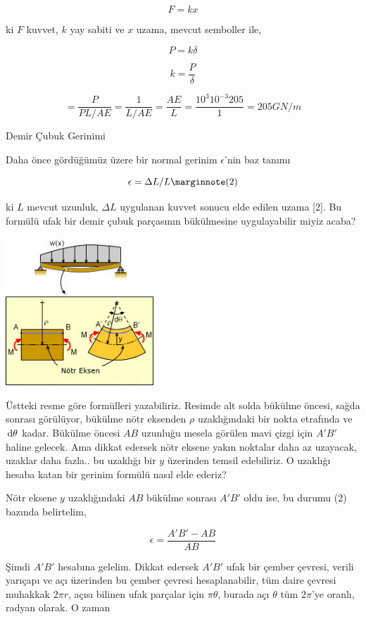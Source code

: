 \documentclass[12pt,fleqn]{article}\usepackage{../../common}
\begin{document}
$$
F = k x
$$

ki $F$ kuvvet, $k$ yay sabiti ve $x$ uzama, mevcut semboller ile,

$$
P = k \delta
$$

$$
k = \frac{P}{\delta}
$$

$$
= \frac{P}{PL / AE} = \frac{1}{L / AE} = \frac{AE}{L} =
\frac{10^3 10^{-3} 205}{1} =
205 GN/m
$$

Demir Çubuk Gerinimi

Daha önce gördüğümüz üzere bir normal gerinim $\epsilon$'nin baz tanımı

$$
\epsilon = \Delta L / L
\mlabel{2}
$$

ki $L$ mevcut uzunluk, $\Delta L$ uygulanan kuvvet sonucu elde edilen uzama [2].
Bu formülü ufak bir demir çubuk parçasının bükülmesine uygulayabilir miyiz
acaba? 

\includegraphics[width=15em]{phy_020_strs_00_03.jpg}

Üstteki resme göre formülleri yazabiliriz. Resimde alt solda bükülme öncesi,
sağda sonrası görülüyor, bükülme nötr eksenden $\rho$ uzaklığındaki bir nokta
etrafında ve $\,\mathrm{d}\theta$ kadar. Bükülme öncesi $AB$ uzunluğu mesela görülen mavi
çizgi için $A'B'$ haline gelecek. Ama dikkat edersek nötr eksene yakın noktalar
daha az uzayacak, uzaklar daha fazla.. bu uzaklığı bir $y$ üzerinden temsil
edebiliriz. O uzaklığı hesaba katan bir gerinim formülü nasıl elde ederiz?

Nötr eksene $y$ uzaklığındaki $AB$ bükülme sonrası $A'B'$ oldu ise, bu durumu
(2) bazında belirtelim,

$$
\epsilon = \frac{A'B' - AB}{AB}
$$

Şimdi $A'B'$ hesabına gelelim. Dikkat edersek $A'B'$ ufak bir çember çevresi,
verili yarıçapı ve açı üzerinden bu çember çevresi hesaplanabilir, tüm daire
çevresi muhakkak $2 \pi r$, açısı bilinen ufak parçalar için $\pi \theta$,
burada açı $\theta$ tüm $2 \pi$'ye oranlı, radyan olarak. O zaman
\end{document}
